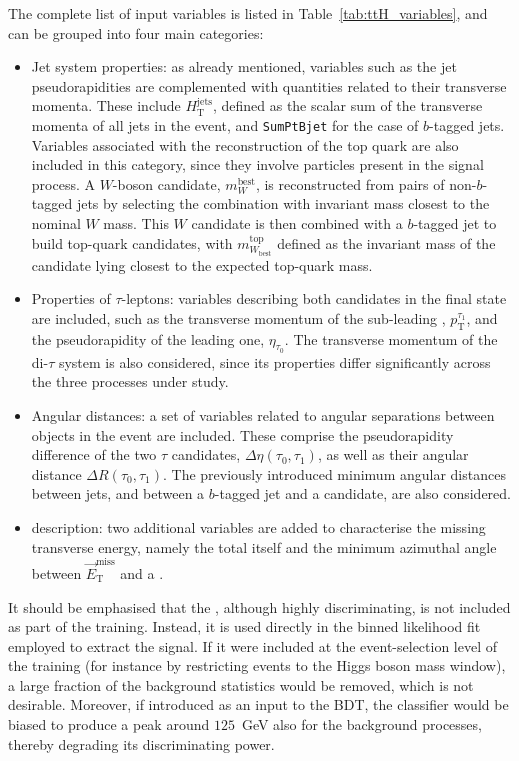 The complete list of input variables is listed in Table~\ref{tab:ttH_variables}, and can be grouped into four main categories:  
\begin{itemize}
    \item Jet system properties: as already mentioned, variables such as the jet pseudorapidities are complemented with quantities related to their transverse momenta. These include $H^{\text{jets}}_{\text{T}}$, defined as the scalar sum of the transverse momenta of all jets in the event, and \texttt{SumPtBjet} for the case of $b$-tagged jets. Variables associated with the reconstruction of the top quark are also included in this category, since they involve particles present in the signal process. A $W$-boson candidate, $m^{\text{best}}_{W}$, is reconstructed from pairs of non-$b$-tagged jets by selecting the combination with invariant mass closest to the nominal $W$ mass. This $W$ candidate is then combined with a $b$-tagged jet to build top-quark candidates, with $m^{\text{top}}_{W_{\text{best}}}$ defined as the invariant mass of the candidate lying closest to the expected top-quark mass.
    \item Properties of $\tau$-leptons: variables describing both \tauhad candidates in the final state are included, such as the transverse momentum of the sub-leading \tauhad, $p^{\tau_1}_{\text{T}}$, and the pseudorapidity of the leading one, $\eta_{\tau_0}$. The transverse momentum of the di-$\tau$ system is also considered, since its properties differ significantly across the three processes under study.
    \item Angular distances: a set of variables related to angular separations between objects in the event are included. These comprise the pseudorapidity difference of the two $\tau$ candidates, $\Delta\eta(\tau_0,\tau_1)$, as well as their angular distance $\Delta R(\tau_0,\tau_1)$. The previously introduced minimum angular distances between jets, and between a $b$-tagged jet and a \tauhad candidate, are also considered.
    \item \etmiss description: two additional variables are added to characterise the missing transverse energy, namely the total \etmiss itself and the minimum azimuthal angle between $\vec{E}^{\text{miss}}_{\text{T}}$ and a \tauhad.
\end{itemize}

It should be emphasised that the \mtt, although highly discriminating, is not included as part of the training. Instead, it is used directly in the binned likelihood fit employed to extract the signal. If it were included at the event-selection level of the training (for instance by restricting events to the Higgs boson mass window), a large fraction of the background statistics would be removed, which is not desirable. Moreover, if introduced as an input to the BDT, the classifier would be biased to produce a peak around $125$~GeV also for the background processes, thereby degrading its discriminating power.

